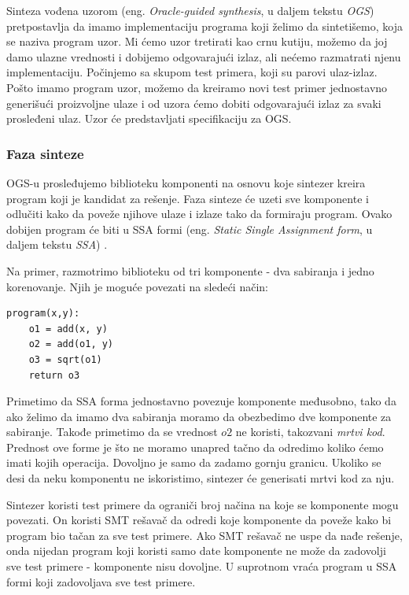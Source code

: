 Sinteza vođena uzorom (eng. \emph{Oracle-guided synthesis}, u daljem tekstu \emph{OGS}) \cite{PSE} pretpostavlja da imamo implementaciju programa koji želimo da sintetišemo, koja se naziva program uzor. Mi ćemo uzor tretirati kao crnu kutiju, možemo da joj damo ulazne vrednosti i dobijemo odgovarajući izlaz, ali nećemo razmatrati njenu implementaciju. Počinjemo sa skupom test primera, koji su parovi ulaz-izlaz. Pošto imamo program uzor, možemo da kreiramo novi test primer jednostavno generišući proizvoljne ulaze i od uzora ćemo dobiti odgovarajući izlaz za svaki prosleđeni ulaz. Uzor će predstavljati specifikaciju za OGS.


\subsubsection*{Faza sinteze}

OGS-u prosleđujemo biblioteku komponenti na osnovu koje sintezer kreira program koji je kandidat za rešenje. Faza sinteze će uzeti sve komponente i odlučiti kako da poveže njihove ulaze i izlaze tako da formiraju program. Ovako dobijen program će biti u SSA formi (eng. \emph{Static Single Assignment form}, u daljem tekstu \emph{SSA}) \cite{SSA}.

Na primer, razmotrimo biblioteku od tri komponente - dva sabiranja i jedno korenovanje. Njih je moguće povezati na sledeći način:

\begin{lstlisting}
program(x,y):
	o1 = add(x, y)
	o2 = add(o1, y)
	o3 = sqrt(o1)
	return o3
\end{lstlisting}

Primetimo da SSA forma jednostavno povezuje komponente me\-đu\-so\-bno, tako da ako želimo da imamo dva sabiranja moramo da obezbedimo dve komponente za sabiranje. Takođe primetimo da se vrednost $o2$ ne koristi, takozvani \emph{mrtvi kod}. Prednost ove forme je što ne moramo unapred tačno da odredimo koliko ćemo imati kojih operacija. Dovoljno je samo da zadamo gornju granicu. Ukoliko se desi da neku komponentu ne iskoristimo, sintezer će generisati mrtvi kod za nju.

Sintezer koristi test primere da ograniči broj načina na koje se komponente mogu povezati. On koristi SMT rešavač da odredi koje komponente da poveže kako bi program bio tačan za sve test primere. Ako SMT rešavač ne uspe da nađe rešenje, onda nijedan program koji koristi samo date komponente ne može da zadovolji sve test primere - komponente nisu dovoljne. U suprotnom vraća program u SSA formi koji zadovoljava sve test primere.


